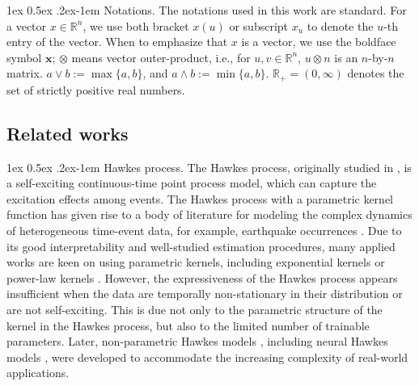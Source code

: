 \documentclass[11pt]{article}
\makeatletter
\theoremstyle{remark}
\theoremstyle{plain}
\newcommand{\R}{\mathbb{R}}
\renewcommand{\paragraph}{%
  \@startsection{paragraph}{4}%
  {\z@}{1ex \@plus 0.5ex \@minus .2ex}{-1em}%
  {\normalfont\normalsize\itshape}%
}
\makeatother
\begin{document}
\paragraph{Notations.} The notations used in this work are standard.
For a vector $x \in \R^n$, we use both bracket $x(u)$ or subscript $x_u$ to denote the $u$-th entry of the vector. When to emphasize that $x$ is a vector, we use the boldface symbol $\boldsymbol{x}$; $\otimes$ means vector outer-product, i.e., for $u, v \in \R^n$, $u \otimes n$ is an $n$-by-$n$ matrix.
$a \vee b := \max\{ a, b\}$, and  $a \wedge b := \min \{ a, b\}$.
$\R_+ = (0, \infty)$ denotes the set of strictly positive real numbers.





\subsection{Related works}




\paragraph{Hawkes process.} The Hawkes process, originally studied in \cite{hawkes1971spectra}, is a self-exciting continuous-time point process model, which can capture the excitation effects among events. The Hawkes process \cite{hawkes1971point, hawkes1971spectra, hawkes1974cluster} with a parametric kernel function has given rise to a body of literature for modeling the complex dynamics of heterogeneous time-event data, for example, earthquake occurrences \cite{ogata1988statistical, marsan2008extending}. Due to its good interpretability and well-studied estimation procedures, many applied works are keen on using parametric kernels, including exponential kernels \cite{zhou2013learninga, farajtabar2014shaping, yan2015machine, hall2016tracking} or power-law kernels \cite{zhao2015seismic, zhang2016modeling}. However, the expressiveness of the Hawkes process appears insufficient when the data are temporally non-stationary in their distribution or are not self-exciting. This is due not only to the parametric structure of the kernel in the Hawkes process, but also to the limited number of trainable parameters. Later, non-parametric Hawkes models \cite{hansen2015lasso}, including neural Hawkes models \cite{okawa2021dynamic}, were developed to accommodate the increasing complexity of real-world applications.
\end{document}
